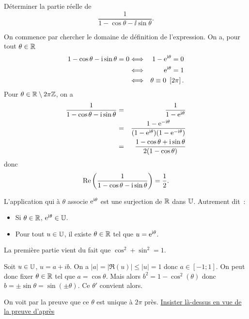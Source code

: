 \documentclass{magnolia}
\begin{document}
\begin{exoUnique}
\exo Déterminer la partie réelle de
  \[\frac{1}{1-\cos\theta-\ii\sin\theta}.\]
  \begin{sol}
  On commence par chercher le domaine de définition de l'expression. On a, pour tout $\theta\in\mathbb{R}$
  \begin{eqnarray*}
1-\cos\theta-{\rm i}\sin\theta=0
&\Longleftrightarrow& 1-{\rm e}^{{\rm i} \theta}=0\\
&\Longleftrightarrow& {\rm e}^{{\rm i} \theta}=1\\
&\Longleftrightarrow& \theta\equiv 0\ \left[2\pi\right].
  \end{eqnarray*}
  Pour $\theta\in\mathbb{R}\setminus 2\pi\mathbb{Z}$, on a
  \begin{eqnarray*}
\frac{1}{1-\cos\theta-{\rm i}\sin\theta}
&=& \frac{1}{1-{\rm e}^{{\rm i}\theta}}\\
&=& \frac{1-{\rm e}^{-{\rm i}\theta}}{(1-{\rm e}^{{\rm i}\theta})(1-{\rm e}^{-{\rm i}\theta})}\\
&=& \frac{1-\cos\theta+{\rm i}\sin\theta}{2(1-\cos\theta)}
  \end{eqnarray*}
  donc
  \[\mathop{\rm Re}\left(\frac{1}{1-\cos\theta-{\rm i}\sin\theta}\right)=\frac{1}{2}.\] 
  \end{sol}
\end{exoUnique}


\begin{proposition}[utile=-3,nom={Paramétrisation de $\U$ par \og l'exponentielle $\ii\theta$ \fg}]
L'application qui à $\theta$ associe ${\rm e}^{{\rm i}\theta}$ est une surjection de $\mathbb{R}$
dans $\U$. Autrement dit~:
\begin{itemize}
\item Si $\theta\in\mathbb{R}$, $\e^{\ii\theta}\in\U$.
\item Pour tout $u\in\U$, il existe $\theta\in\mathbb{R}$ tel que $u={\rm e}^{{\rm i}\theta}$.
\end{itemize}
\end{proposition}

\begin{preuve}
La première partie vient du fait que $\cos^2+\sin^2=1$.

Soit $u\in \U$, $u=a+ib$. On a $|a|=|\Re(u)|\leq |u|=1$ donc $a\in [-1;1]$. On peut donc fixer $\theta\in \mathbb{R}$ tel que $a=\cos \theta$. Mais alors $b^2=1-\cos^2(\theta)$ donc $b=\pm \sin \theta=\sin(\pm \theta)$. Ce $\theta'$ convient alors.

On voit par la preuve que ce $\theta$ est unique à $2\pi$ près. \underline{Insister là-dessus en vue de la preuve d'après}
\end{preuve}
\end{document}
